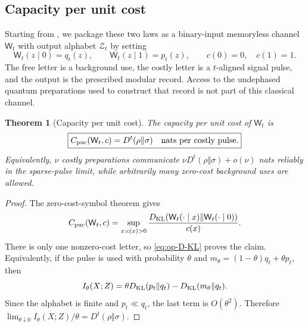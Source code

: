 \documentclass[11pt]{article}
\newtheorem{theorem}[theorem]{Theorem}
\theoremstyle{remark}
\newcommand{\1}{\mathbbm{1}}
\begin{document}
\subsection{Capacity per unit cost}
\label{subsec:op-present}

Starting from , we package these two
laws as a
binary-input memoryless channel
$\mathsf W_t$ with output alphabet $\mathcal Z_t$ by setting
\begin{equation}
 \mathsf W_t(z\mid0)=q_t(z),\qquad
 \mathsf W_t(z\mid1)=p_t(z),\qquad c(0)=0,\quad c(1)=1.
 \label{eq:op-on-off-channel}
\end{equation}
The free letter is a background use, the costly letter is a
$t$-aligned signal pulse, and the output is the prescribed modular
record.  Access to the undephased quantum preparations used to
construct that record is not part of this classical channel.

\begin{theorem}[Capacity per unit cost]
\label{thm:op-capacity}
The capacity per unit cost of $\mathsf W_t$ is
\begin{equation}
 \boxed{
 C_{\rm puc}(\mathsf W_t,c)=D^t(\rho\Vert\sigma)
 \quad\text{nats per costly pulse}.}
 \label{eq:op-capacity}
\end{equation}
Equivalently, $\nu$ costly preparations communicate
$\nu D^t(\rho\Vert\sigma)+o(\nu)$ nats reliably in the sparse-pulse
limit, while arbitrarily many zero-cost background uses are allowed.
\end{theorem}

\begin{proof}
The zero-cost-symbol theorem \cite[Theorem~3]{verdu1990capacity} gives
\begin{equation}
 C_{\rm puc}(\mathsf W_t,c)
 =\sup_{x:c(x)>0}
 \frac{D_{\rm KL}(\mathsf W_t(\cdot\mid x)
 \Vert\mathsf W_t(\cdot\mid0))}{c(x)}.
\end{equation}
There is only one nonzero-cost letter, so \eqref{eq:op-D-KL} proves the
claim.  Equivalently, if the pulse is used with probability $\theta$ and
$m_\theta=(1-\theta)q_t+\theta p_t$, then
\begin{equation}
 I_\theta(X;Z)
 =\theta D_{\rm KL}(p_t\Vert q_t)-D_{\rm KL}(m_\theta\Vert q_t).
\end{equation}
Since the alphabet is finite and $p_t\ll q_t$, the last term is
$O(\theta^2)$.  Therefore
$\lim_{\theta\downarrow0}I_\theta(X;Z)/\theta
=D^t(\rho\Vert\sigma)$.
\end{proof}
\end{document}
